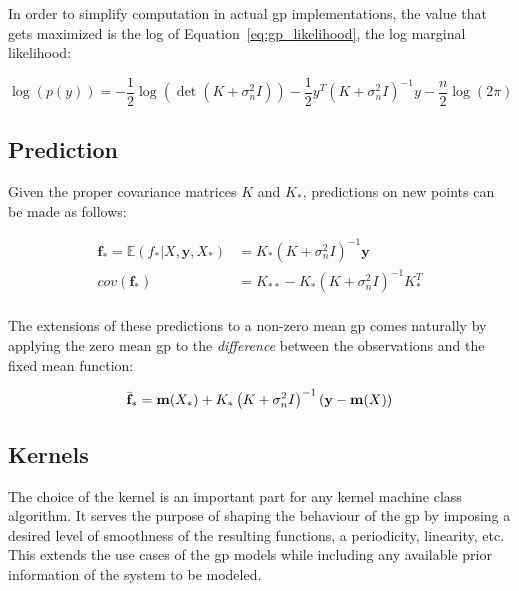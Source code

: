 In order to simplify computation in actual \acrshort{gp} implementations, the
value that gets maximized is the log of Equation~\ref{eq:gp_likelihood}, the log
marginal likelihood:

\begin{equation}\label{eq:gp_log_likelihood}
    \log(p(y)) = - \frac{1}{2}\log{\left(
                                \det{\left(
                                        K + \sigma_n^2I
                                \right)}
                            \right)}
                - \frac{1}{2}y^T\left(
                                    K + \sigma_n^2I
                                \right)^{-1}y
                - \frac{n}{2}\log{\left(2\pi\right)}
\end{equation}

\subsection{Prediction}

Given the proper covariance matrices $K$ and $K_*$, predictions on new points
can be made as follows:

\begin{equation}
    \begin{aligned}
        \mathbf{f_*} = \mathbb{E}\left(f_*|X, \mathbf{y}, X_*\right) &=
        K_*\left(K + \sigma_n^2I\right)^{-1}\mathbf{y} \\
        cov(\mathbf{f_*}) &= K_{**} - K_*\left(K +\sigma_n^2I\right)^{-1}K_*^T \\
    \end{aligned}
\end{equation}

The extensions of these predictions to a non-zero mean \acrshort{gp} comes
naturally by applying the zero mean \acrshort{gp} to the \textit{difference}
between the observations and the fixed mean function:

\begin{equation}
    \bar{\mathbf{f}}_* = \mathbf{m}(X_*) + K_*\left(K + 
    \sigma_n^2I\right)^{-1}(\mathbf{y} - \mathbf{m}(X)) \\
\end{equation}

\subsection{Kernels}\label{sec:Kernels}
The choice of the kernel is an important part for any kernel machine class
algorithm. It serves the purpose of shaping the behaviour of the \acrshort{gp}
by imposing a desired level of smoothness of the resulting functions, a
periodicity, linearity, etc. This extends the use cases of the \acrshort{gp}
models while including any available prior information of the system to be
modeled.

